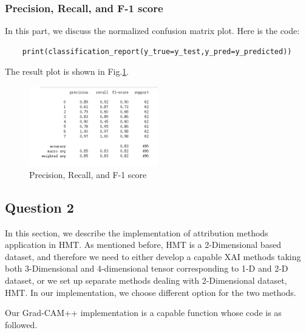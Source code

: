 \documentclass[conference]{IEEEtran}
\begin{document}
\subsubsection{Precision, Recall, and F-1 score}
In this part, we discuss the normalized confusion matrix plot. Here is the code:
\begin{lstlisting}
    print(classification_report(y_true=y_test,y_pred=y_predicted))
\end{lstlisting}
The result plot is shown in Fig.\ref{Fig.t3q1d}.
\begin{figure}[h] 
    \centering
    \includegraphics[width=0.5\textwidth]{T3Q1d.png}
    \caption{Precision, Recall, and F-1 score} 
    \label{Fig.t3q1d} 
\end{figure}

\subsection{Question 2}

In this section, we describe the implementation of attribution methods application in HMT. As mentioned before, HMT is a 2-Dimensional based dataset, and therefore we need to either develop a capable XAI methods taking both 3-Dimensional and 4-dimensional tensor corresponding to 1-D and 2-D dataset, or we set up separate methods dealing with 2-Dimensional dataset, HMT. In our implementation, we choose different option for the two methods.\par

Our Grad-CAM++ implementation is a capable function whose code is as followed.
\end{document}
